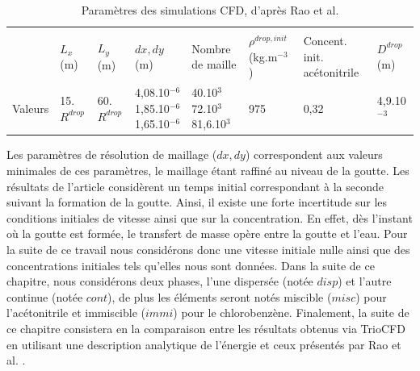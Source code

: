 \begin{table}[H]
	\centering  %
	\begin{tabularx}{\textwidth}{@{}lYYYYYYY@{}}
		\toprule
		&\\
		& $L_x$ (m)
		& $L_y$ (m)
		& $dx, dy$ (m)
		& Nombre de maille
		& $\rho^{drop,init}$ (kg.m$^{-3}$)
		& Concent. init. acétonitrile
		& $D^{drop}$  (m)\\
		\midrule
		 Valeurs & 15.$R^{drop}$ & 60.$R^{drop}$ & 4,08.10$^{-6}$ 1,85.10$^{-6}$ 1,65.10$^{-6}$ & 40.10$^{3}$  \hspace{2cm}  72.10$^{3}$  \hspace{2cm} 81,6.10$^{3}$ & 975 & 0,32& 4,9.10$^{-3}$ \\
		\bottomrule
	\end{tabularx}
	\caption{Paramètres des simulations CFD, d'après Rao et al.\cite{rao_influence_2015}} \label{table:rao_al}
\end{table}
Les paramètres de résolution de maillage ($dx,dy$) correspondent aux valeurs minimales de ces paramètres, le maillage étant raffiné au niveau de la goutte. Les résultats de l'article considèrent un temps initial correspondant à la seconde suivant la formation de la goutte. Ainsi, il existe une forte incertitude sur les conditions initiales de vitesse ainsi que sur la concentration. En effet, dès l'instant où la goutte est formée, le transfert de masse opère entre la goutte et l'eau. Pour la suite de ce travail nous considérons donc une vitesse initiale nulle ainsi que des concentrations initiales tels qu'elles nous sont données. Dans la suite de ce chapitre, nous considérons deux phases, l'une dispersée (notée $disp$) et l'autre continue (notée $cont$), de plus les éléments seront notés miscible ($misc$) pour l'acétonitrile et immiscible ($immi$) pour le chlorobenzène.
Finalement, la suite de ce chapitre consistera en la comparaison entre les résultats obtenus via TrioCFD en utilisant une description analytique de l'énergie et ceux présentés par Rao et al. \cite{rao_influence_2015}.
